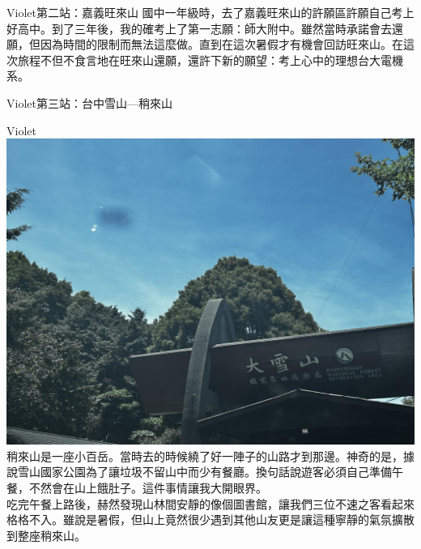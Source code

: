 \documentclass{article}
\begin{document}
\begin{large}
    \begin{boxpar}{Violet}{第二站：嘉義旺來山}
        國中一年級時，去了嘉義旺來山的許願區許願自己考上好高中。到了三年後，我的確考上了第一志願：師大附中。雖然當時承諾會去還願，但因為時間的限制而無法這麼做。直到在這次暑假才有機會回訪旺來山。在這次旅程不但不食言地在旺來山還願，還許下新的願望：考上心中的理想台大電機系。
    \end{boxpar}
\begin{boxpar}{Violet}{第三站：台中雪山—稍來山}
  \begin{sblock}{Violet}
    \includegraphics[width=\linewidth]{mountsnow.jpg}
    \tcblower
    稍來山是一座小百岳。當時去的時候繞了好一陣子的山路才到那邊。神奇的是，據說雪山國家公園為了讓垃圾不留山中而少有餐廳。換句話說遊客必須自己準備午餐，不然會在山上餓肚子。這件事情讓我大開眼界。\\

    吃完午餐上路後，赫然發現山林間安靜的像個圖書館，讓我們三位不速之客看起來格格不入。雖說是暑假，但山上竟然很少遇到其他山友更是讓這種寧靜的氣氛擴散到整座稍來山。
  \end{sblock}
\end{boxpar}

\end{large}
\end{document}
